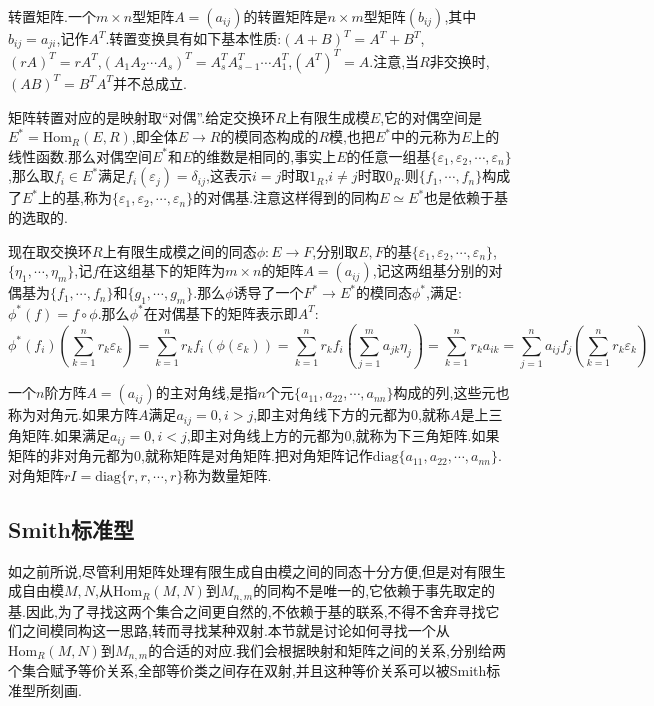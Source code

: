 转置矩阵.一个$m\times n$型矩阵$A=(a_{ij})$的转置矩阵是$n\times m$型矩阵$(b_{ij})$,其中$b_{ij}=a_{ji}$,记作$A^T$.转置变换具有如下基本性质:$(A+B)^T=A^T+B^T$,$(rA)^T=rA^T$,$(A_1A_2\cdots A_s)^T=A_s^TA_{s-1}^T\cdots A_1^T$,$(A^T)^T=A$.注意,当$R$非交换时,$(AB)^T=B^TA^T$并不总成立.

矩阵转置对应的是映射取“对偶”.给定交换环$R$上有限生成模$E$,它的对偶空间是$E^*=\mathrm{Hom}_R(E,R)$,即全体$E\to R$的模同态构成的$R$模,也把$E^*$中的元称为$E$上的线性函数.那么对偶空间$E^*$和$E$的维数是相同的,事实上$E$的任意一组基$\{\varepsilon_1,\varepsilon_2,\cdots,\varepsilon_n\}$,那么取$f_i\in E^*$满足$f_i(\varepsilon_j)=\delta_{ij}$,这表示$i=j$时取$1_R$,$i\not=j$时取$0_R$.则$\{f_1,\cdots,f_n\}$构成了$E^*$上的基,称为$\{\varepsilon_1,\varepsilon_2,\cdots,\varepsilon_n\}$的对偶基.注意这样得到的同构$E\simeq E^*$也是依赖于基的选取的.

现在取交换环$R$上有限生成模之间的同态$\phi:E\to F$,分别取$E,F$的基$\{\varepsilon_1,\varepsilon_2,\cdots,\varepsilon_n\}$,$\{\eta_1,\cdots,\eta_m\}$,记$f$在这组基下的矩阵为$m\times n$的矩阵$A=(a_{ij})$,记这两组基分别的对偶基为$\{f_1,\cdots,f_n\}$和$\{g_1,\cdots,g_m\}$.那么$\phi$诱导了一个$F^*\to E^*$的模同态$\phi^*$,满足:$\phi^*(f)=f\circ\phi$.那么$\phi^*$在对偶基下的矩阵表示即$A^T$:
$$\phi^*(f_i)(\sum_{k=1}^{n}r_k\varepsilon_k)
=\sum_{k=1}^{n}r_kf_i\left(\phi(\varepsilon_k)\right)
=\sum_{k=1}^{n}r_kf_i\left(\sum_{j=1}^{m}a_{jk}\eta_j\right)
=\sum_{k=1}^{n}r_ka_{ik}=\sum_{j=1}^{n}a_{ij}f_j\left(\sum_{k=1}^{n}r_k\varepsilon_k\right)$$

一个$n$阶方阵$A=(a_{ij})$的主对角线,是指$n$个元$\{a_ {11},a_{22},\cdots,a_{nn}\}$构成的列,这些元也称为对角元.如果方阵$A$满足$a_{ij}=0,i>j$,即主对角线下方的元都为0,就称$A$是上三角矩阵.如果满足$a_{ij}=0,i<j$,即主对角线上方的元都为0,就称为下三角矩阵.如果矩阵的非对角元都为0,就称矩阵是对角矩阵.把对角矩阵记作$\mathrm{diag}\{a_ {11},a_{22},\cdots,a_{nn}\}$.对角矩阵$rI=\mathrm{diag}\{r,r,\cdots,r\}$称为数量矩阵.
\newpage
\subsection{Smith标准型}

如之前所说,尽管利用矩阵处理有限生成自由模之间的同态十分方便,但是对有限生成自由模$M,N$,从$\mathrm{Hom}_R(M,N)$到$M_{n,m}$的同构不是唯一的,它依赖于事先取定的基.因此,为了寻找这两个集合之间更自然的,不依赖于基的联系,不得不舍弃寻找它们之间模同构这一思路,转而寻找某种双射.本节就是讨论如何寻找一个从$\mathrm{Hom}_R(M,N)$到$M_{n,m}$的合适的对应.我们会根据映射和矩阵之间的关系,分别给两个集合赋予等价关系,全部等价类之间存在双射,并且这种等价关系可以被Smith标准型所刻画.

